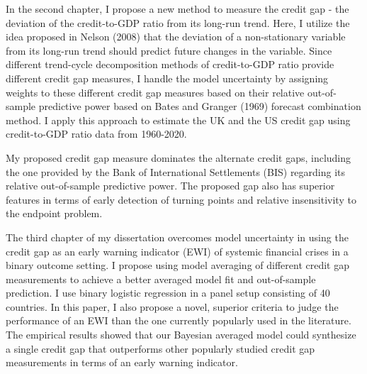 \begin{preliminary}
In the second chapter, I propose a new method to measure the credit gap - the deviation of the credit-to-GDP ratio from its long-run trend. Here, I utilize the idea proposed in Nelson (2008) that the deviation of a non-stationary variable from its long-run trend should predict future changes in the variable. Since different trend-cycle decomposition methods of credit-to-GDP ratio provide different credit gap measures, I handle the model uncertainty by assigning weights to these different credit gap measures based on their relative out-of-sample predictive power based on Bates and Granger (1969) forecast combination method. I apply this approach to estimate the UK and the US credit gap using credit-to-GDP ratio data from 1960-2020.

My proposed credit gap measure dominates the alternate credit gaps, including the one provided by the Bank of International Settlements (BIS) regarding its relative out-of-sample predictive power. The proposed gap also has superior features in terms of early detection of turning points and relative insensitivity to the endpoint problem.

The third chapter of my dissertation overcomes model uncertainty in using the credit gap as an early warning indicator (EWI) of systemic financial crises in a binary outcome setting. I propose using model averaging of different credit gap measurements to achieve a better averaged model fit and out-of-sample prediction. I use binary logistic regression in a panel setup consisting of 40 countries. In this paper, I also propose a novel, superior criteria to judge the performance of an EWI than the one currently popularly used in the literature. The empirical results showed that our Bayesian averaged model could synthesize a single credit gap that outperforms other popularly studied credit gap measurements in terms of an early warning indicator.
\newpage


% 
% 
% 



\end{preliminary}
